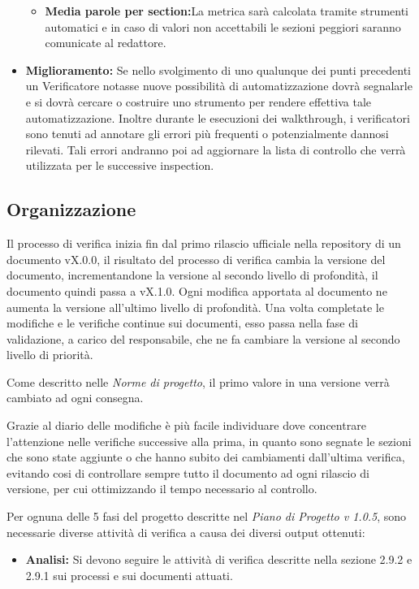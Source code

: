 \documentclass[a4paper]{article}
\begin{document}
\begin{itemize}
\begin{itemize}
						\item \textbf{Media parole per section:}La metrica sarà calcolata tramite strumenti automatici e in caso di valori non accettabili le sezioni peggiori saranno comunicate al redattore.
					\end{itemize}
					\item \textbf{Miglioramento:} Se nello svolgimento di uno qualunque dei punti precedenti un Verificatore
					notasse nuove possibilità di automatizzazione dovrà segnalarle e si dovrà cercare o costruire uno strumento per
					rendere effettiva tale automatizzazione. Inoltre durante le esecuzioni dei walkthrough, i verificatori sono
					tenuti ad annotare gli errori più frequenti o potenzialmente dannosi rilevati. Tali errori andranno poi ad
					aggiornare la lista di controllo che verrà utilizzata per le successive inspection.
				\end{itemize}		
		\subsection{Organizzazione}
			Il processo di verifica inizia fin dal primo rilascio ufficiale nella repository di un documento vX.0.0, il risultato 
			del processo di verifica cambia la versione del documento, incrementandone la versione al secondo livello di profondità, 
			il documento quindi passa a vX.1.0. Ogni modifica apportata al documento ne aumenta la versione all'ultimo livello di 
			profondità. Una volta completate le modifiche e le verifiche continue sui documenti, esso passa nella fase di validazione,
			a carico del responsabile, che ne fa cambiare la versione al secondo livello di priorità. 
			
			Come descritto nelle \emph{Norme di progetto}, il primo valore in una versione verrà cambiato ad ogni consegna.
			
			Grazie al diario delle modifiche è più facile individuare dove concentrare l'attenzione nelle verifiche successive 
			alla prima, in quanto sono segnate le sezioni che sono state aggiunte o che hanno subito dei cambiamenti dall'ultima
			 verifica, evitando cosi di controllare sempre tutto il documento ad ogni rilascio di versione, per cui ottimizzando 
			 il tempo necessario al controllo.

			Per ognuna delle 5 fasi del progetto descritte nel \emph{Piano di Progetto v 1.0.5}, sono necessarie diverse attività 
			di verifica a causa dei diversi output ottenuti:

			\begin{itemize}
				\item \textbf{Analisi:} Si devono seguire le attività di verifica descritte nella sezione 2.9.2 e 2.9.1 sui processi 
				e sui documenti attuati.
			\end{itemize}
			
\end{document}
